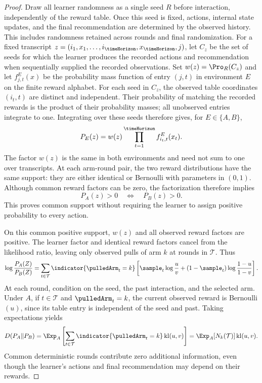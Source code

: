 \begin{proof}
Draw all learner randomness as a single seed $R$ before interaction,
independently of the reward table. Once this seed is fixed, actions,
internal state updates, and the final recommendation are determined
by the observed history. This includes randomness retained across
rounds and final randomization. For a fixed
transcript $z=(i_1,x_1,\ldots,i_{\timeHorizon},x_{\timeHorizon},j)$,
let $C_z$ be the set of seeds for which the learner produces the
recorded actions and recommendation when sequentially supplied the
recorded observations. Set $w(z)=\Pro_R(C_z)$ and let
$f^E_{j,t}(x)$ be the probability mass function of entry $(j,t)$
in environment $E$ on the finite reward alphabet.
For each seed in $C_z$, the observed table coordinates $(i_t,t)$
are distinct and independent. Their probability of matching the
recorded rewards is the product of their probability masses;
all unobserved entries integrate to one. Integrating over these seeds
therefore gives, for $E\in\{A,B\}$,
\[
P_E(z)=w(z)\prod_{t=1}^{\timeHorizon}
f^E_{i_t,t}(x_t).
\]
The factor $w(z)$ is the same in both environments and need not sum
to one over transcripts. At each arm-round pair, the two reward
distributions have the same support: they are either identical or
Bernoulli with parameters in $(0,1)$. Although common reward factors
can be zero, the factorization therefore implies
\[
P_A(z)>0\quad\Longleftrightarrow\quad P_B(z)>0.
\]
This proves common support without requiring the learner to assign
positive probability to every action.

On this common positive support, $w(z)$ and all observed reward
factors are positive. The learner factor and identical reward factors
cancel from the likelihood ratio, leaving only observed pulls of arm
$k$ at rounds in $\mathcal T$. Thus
\[
\log\frac{P_A(Z)}{P_B(Z)}
=\sum_{t\in\mathcal T}\indicator{\pulledArm_t=k}
\left[\sample_t\log\frac{u}{v}
+(1-\sample_t)\log\frac{1-u}{1-v}\right].
\]
At each round, condition on the seed, the past interaction, and the
selected arm. Under $A$, if $t\in\mathcal T$ and $\pulledArm_t=k$,
the current observed reward is Bernoulli$(u)$, since its table entry
is independent of the seed and past. Taking expectations yields
\[
D(P_A\Vert P_B)
=\Exp_A\left[\sum_{t\in\mathcal T}
\indicator{\pulledArm_t=k}\operatorname{kl}(u,v)\right]
=\Exp_A[N_k(\mathcal T)]\operatorname{kl}(u,v).
\]
Common deterministic rounds contribute zero additional information,
even though the learner's actions and final recommendation may
depend on their rewards.


\end{proof}
